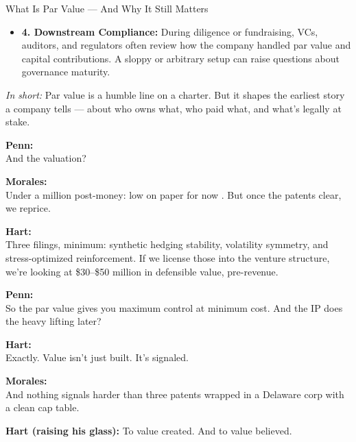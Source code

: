 \begin{TechnicalSidebar}{What Is Par Value — And Why It Still Matters}
\begin{itemize}
    \item \textbf{4. Downstream Compliance:}  
    During diligence or fundraising, VCs, auditors, and regulators often review how the company handled par value and capital contributions. A sloppy or arbitrary setup can raise questions about governance maturity.
  \end{itemize}
  
  \medskip
  
  \textit{In short:} Par value is a humble line on a charter. But it shapes the earliest story a company tells — about who owns what, who paid what, and what’s legally at stake.
  
\end{TechnicalSidebar}

\textbf{Penn:} \\
And the valuation?

\textbf{Morales:} \\
Under a million post-money: low on paper for now . But once the patents clear, we reprice.

\textbf{Hart:} \\
Three filings, minimum: synthetic hedging stability, volatility symmetry, and stress-optimized reinforcement. 
If we license those into the venture structure, we're looking at \$30–\$50 million in defensible value, pre-revenue.

\textbf{Penn:} \\
So the par value gives you maximum control at minimum cost. And the IP does the heavy lifting later?

\textbf{Hart:} \\
Exactly. Value isn’t just built. It’s signaled.

\textbf{Morales:} \\
And nothing signals harder than three patents wrapped in a Delaware corp with a clean cap table.

\textbf{Hart (raising his glass):}
To value created. And to value believed.

\medskip

